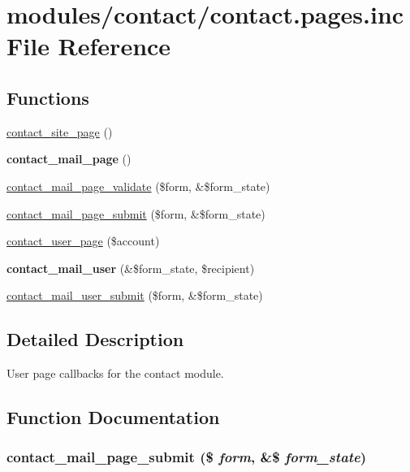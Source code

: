 \hypertarget{contact_8pages_8inc}{
\section{modules/contact/contact.pages.inc File Reference}
\label{contact_8pages_8inc}
}
\subsection*{Functions}
\begin{CompactItemize}
\item 
\hyperlink{contact_8pages_8inc_468e4e896bff41566960b9061993c9c2}{contact\_\-site\_\-page} ()
\item 
\hypertarget{contact_8pages_8inc_1112ec7b1d8a5df4e15c19eae3d7809b}{
\textbf{contact\_\-mail\_\-page} ()}
\label{contact_8pages_8inc_1112ec7b1d8a5df4e15c19eae3d7809b}

\item 
\hyperlink{contact_8pages_8inc_e236d6c9b3d50da9ed4ca7164eee5b3a}{contact\_\-mail\_\-page\_\-validate} (\$form, \&\$form\_\-state)
\item 
\hyperlink{contact_8pages_8inc_79ac736eaf534d47934a0eab1a74b5d9}{contact\_\-mail\_\-page\_\-submit} (\$form, \&\$form\_\-state)
\item 
\hyperlink{contact_8pages_8inc_64cbb5319d9172b493157b32d2d996af}{contact\_\-user\_\-page} (\$account)
\item 
\hypertarget{contact_8pages_8inc_7783518f510a90b07f98e5e454ca8a3c}{
\textbf{contact\_\-mail\_\-user} (\&\$form\_\-state, \$recipient)}
\label{contact_8pages_8inc_7783518f510a90b07f98e5e454ca8a3c}

\item 
\hyperlink{contact_8pages_8inc_54662925fe803bb08562c88bba0b2582}{contact\_\-mail\_\-user\_\-submit} (\$form, \&\$form\_\-state)
\end{CompactItemize}


\subsection{Detailed Description}
User page callbacks for the contact module. 

\subsection{Function Documentation}
\hypertarget{contact_8pages_8inc_79ac736eaf534d47934a0eab1a74b5d9}{
\subsubsection[{contact\_\-mail\_\-page\_\-submit}]{\setlength{\rightskip}{0pt plus 5cm}contact\_\-mail\_\-page\_\-submit (\$ {\em form}, \/  \&\$ {\em form\_\-state})}}
\label{contact_8pages_8inc_79ac736eaf534d47934a0eab1a74b5d9}


